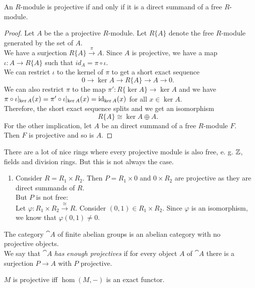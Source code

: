 \begin{proposition}
	An $R$-module is projective if and only if it is a direct summand of a free $R$-module.
\end{proposition}

\begin{proof}
	Let $A$ be the a projective $R$-module. Let $R\{A\}$ denote the free $R$-module generated by the set of $A$. \\
	We have a surjection $R\{A\}\overset{\pi}{\longrightarrow}A$. Since $A$ is projective, we have a map $\iota:A\rightarrow R\{A\}$ such that $id_A=\pi\circ\iota$. \\
	We can restrict $\iota$ to the kernel of $\pi$ to get a short exact sequence
	$$0\rightarrow \ker A \rightarrow R\{A\} \rightarrow A \rightarrow 0.$$
	We can also restrict $\pi$ to the map $\pi':R\{\ker A\}\rightarrow \ker A$ and we have $\pi\circ\iota\vert_{\ker A}(x) = \pi'\circ\iota\vert_{\ker A}(x) = \operatorname{id}_{\ker A}(x)$ for all $x\in\ker A$. \\
	Therefore, the short exact sequence splits and we get an isomorphism $$R\{A\}\cong \ker A \oplus A.$$
	For the other implication, let $A$ be an direct summand of a free $R$-module $F$. Then $F$ is projective and so is $A$. 
\end{proof}

\begin{example}
	There are a lot of nice rings where every projective module is also free, e. g. ${\mathbb Z}$, fields and division rings.
	But this is not always the case.
	\begin{enumerate}[label=(\roman*)]
		\item Consider $R=R_1\times R_2$. Then $P=R_1\times 0$ and $0\times R_2$ are projective as they are direct summands of $R$. \\
		But $P$ is not free: \\
		Let $\varphi:R_1\times R_2 \overset{\cong}{\longrightarrow} R$. Consider $(0,1)\in R_1\times R_2$.
		Since $\varphi$ is an isomorphism, we know that $\varphi(0,1)\neq0$.
	\end{enumerate}
\end{example}

\begin{remark}
	The category $\cat{A}$ of finite abelian groups is an abelian category with no projective objects. \\
	We say that $\cat{A}$ \textit{has enough projectives} if for every object $A$ of $\cat{A}$ there is a surjection $P\rightarrow A$ with $P$ projective.
\end{remark}

\begin{lemma}
	$M$ is projective iff $\hom(M,-)$ is an exact functor.
\end{lemma}